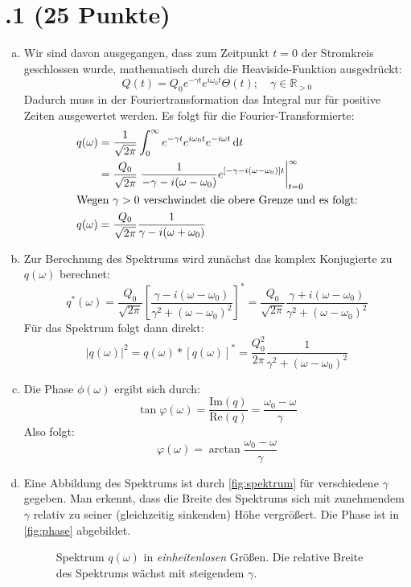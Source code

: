 \section*{\nr.1 \titone (25 Punkte)}
\begin{enumerate}[(a)]
\item 
Wir sind davon ausgegangen, dass zum Zeitpunkt $t=0$ der Stromkreis geschlossen wurde, mathematisch durch die Heaviside-Funktion ausgedrückt:
\begin{equation}
Q(t) = Q_0 e^{-\gamma t} e^{i\omega_0 t}\Theta(t); \quad \gamma\in\mathbb{R}_{>0}
\end{equation}
Dadurch muss in der Fouriertransformation das Integral nur für positive Zeiten ausgewertet werden. Es folgt für die Fourier-Transformierte:
\begin{align}
q(\omega) &= \frac{1}{\sqrt{2\pi}}\int_0^{\infty} e^{-\gamma t} e^{i\omega_0 t} e^{-i\omega t} \,\mathrm{d}t\\ 
&= \frac{Q_0}{\sqrt{2\pi}} \left. \frac{1}{-\gamma-i(\omega-\omega_0)}e^{[-\gamma-i(\omega-\omega_0)]t} \right|_{t=0}^{\infty} \\
\intertext{Wegen $\gamma>0$ verschwindet die obere Grenze und es folgt:}
q(\omega)&= \frac{Q_0}{\sqrt{2\pi}} \frac{1}{\gamma-i(\omega+\omega_0)}
\end{align}
\item Zur Berechnung des Spektrums wird zunächst das komplex Konjugierte zu $q(\omega)$ berechnet:
\begin{equation}
q^*(\omega) =\frac{Q_0}{\sqrt{2\pi}} \left[ \frac{\gamma-i(\omega-\omega_0)}{\gamma^2+(\omega-\omega_0)^2}\right]^* = \frac{Q_0}{\sqrt{2\pi}} \frac{\gamma+i(\omega-\omega_0)}{\gamma^2+(\omega-\omega_0)^2}
\end{equation}
Für das Spektrum folgt dann direkt:
\begin{equation}
|q(\omega)|^2 = q(\omega) * [q(\omega)]^* = \frac{Q_0^2}{2\pi} \frac{1}{\gamma^2+(\omega-\omega_0)^2}
\end{equation}
\item Die Phase $\phi(\omega)$ ergibt sich durch:
\begin{equation}
\tan \varphi(\omega) = \frac{\text{Im}(q)}{\text{Re}(q)} = \frac{\omega_0-\omega}{\gamma}
\end{equation}
Also folgt:
\begin{equation}
\varphi(\omega) = \arctan \frac{\omega_0-\omega}{\gamma}
\end{equation}

\item
Eine Abbildung des Spektrums ist durch \vref{fig:spektrum} für verschiedene $\gamma$ gegeben. Man erkennt, dass die Breite des Spektrums sich mit zunehmendem $\gamma$ relativ zu seiner (gleichzeitig sinkenden) Höhe vergrößert. Die Phase ist in \vref{fig:phase} abgebildet.
\begin{figure}[htbp]
\centering

\caption{Spektrum $q(\omega)$ in \emph{einheitenlosen} Größen. Die relative Breite des Spektrums wächst mit steigendem $\gamma$.}
\label{fig:spektrum}
\end{figure}


\end{enumerate}
